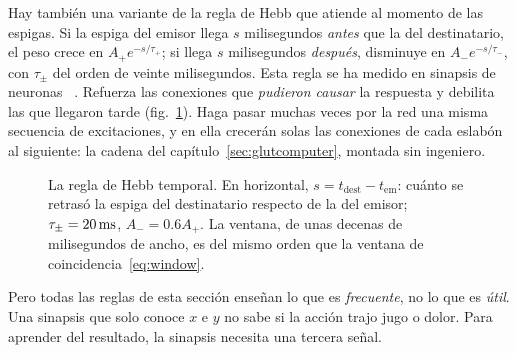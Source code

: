 Hay también una variante de la regla de Hebb que atiende al momento de las espigas. Si la espiga del emisor llega $s$ milisegundos \emph{antes} que la del destinatario, el peso crece en $A_+e^{-s/\tau_+}$; si llega $s$ milisegundos \emph{después}, disminuye en $A_-e^{-s/\tau_-}$, con $\tau_\pm$ del orden de veinte milisegundos. Esta regla se ha medido en sinapsis de neuronas ~\cite{BiPoo1998}. Refuerza las conexiones que \emph{pudieron causar} la respuesta y debilita las que llegaron tarde (fig.~\ref{fig:stdp}). Haga pasar muchas veces por la red una misma secuencia de excitaciones, y en ella crecerán solas las conexiones de cada eslabón al siguiente: la cadena del capítulo~\ref{sec:glutcomputer}, montada sin ingeniero.

\begin{figure}[t]
\centering
{}
\caption{La regla de Hebb temporal. En horizontal, $s=t_{\text{dest}}-t_{\text{em}}$: cuánto se retrasó la espiga del destinatario respecto de la del emisor; $\tau_\pm=20\,\text{ms}$, $A_-=0.6A_+$. La ventana, de unas decenas de milisegundos de ancho, es del mismo orden que la ventana de coincidencia~\eqref{eq:window}.}
\label{fig:stdp}
\end{figure}

Pero todas las reglas de esta sección enseñan lo que es \emph{frecuente}, no lo que es \emph{útil}. Una sinapsis que solo conoce $x$ e $y$ no sabe si la acción trajo jugo o dolor. Para aprender del resultado, la sinapsis necesita una tercera señal.


